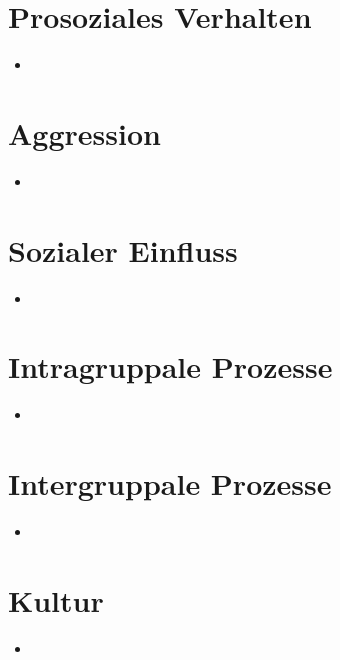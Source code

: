 \documentclass[11pt, paper=a4, twocolumn]{scrartcl}
\begin{document}
	\section{Prosoziales Verhalten}
		\begin{itemize}
			\item
		\end{itemize}



	\section{Aggression}
		\begin{itemize}
			\item
		\end{itemize}


	\section{Sozialer Einfluss}
		\begin{itemize}
			\item
		\end{itemize}



	\section{Intragruppale Prozesse}
		\begin{itemize}
			\item
		\end{itemize}


	\section{Intergruppale Prozesse}
		\begin{itemize}
			\item
		\end{itemize}


	\section{Kultur}
		\begin{itemize}
			\item
		\end{itemize}
\end{document}

